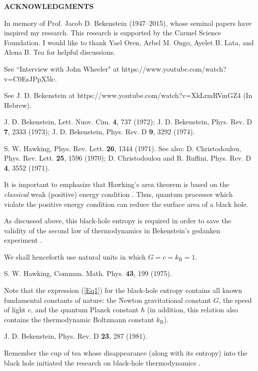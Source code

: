 \documentclass[12pt,preprintnumbers,amsmath,amssymbm,prd]{revtex4-1}
\begin{document}
\bigskip
\noindent
{\bf ACKNOWLEDGMENTS}
\bigskip

In memory of Prof. Jacob D. Bekenstein (1947--2015), whose seminal
papers have inspired my research.
\newline
This research is supported by the Carmel Science Foundation. I would
like to thank Yael Oren, Arbel M. Ongo, Ayelet B. Lata, and Alona B.
Tea for helpful discussions.

\begin{thebibliography}{99}

 See ``Interview with John Wheeler" at
https://www.youtube.com/watch?v=C0EsJPpX5lc.

 See J. D. Bekenstein at
https://www.youtube.com/watch?v=XkLrmRVmGZ4 (In Hebrew).

 J. D. Bekenstein, Lett. Nuov. Cim. {\bf 4}, 737 (1972); J. D.
Bekenstein, Phys. Rev. D {\bf 7}, 2333 (1973); J. D. Bekenstein,
Phys. Rev. D {\bf 9}, 3292 (1974).

 S. W. Hawking, Phys. Rev. Lett. {\bf 26}, 1344
(1971). See also: D. Christodoulou, Phys. Rev. Lett. {\bf 25}, 1596
(1970); D. Christodoulou and R. Ruffini, Phys. Rev. D {\bf 4}, 3552
(1971).

 It is important to emphasize that Hawking's area
theorem is based on the {\it classical} weak (positive) energy
condition \cite{Hawarea}. Thus, quantum processes which violate the
positive energy condition can reduce the surface area of a black
hole.

 As discussed above, this black-hole entropy is
required in order to save the validity of the second law of
thermodynamics in Bekenstein's gedanken experiment
\cite{WheLec,BekLec}.

 We shall henceforth use natural units in which
$G=c=k_{\text{B}}=1$.

 S. W. Hawking, Commun. Math. Phys. {\bf 43}, 199
(1975).

 Note that the expression (\ref{Eq1}) for the
black-hole entropy contains all known fundamental constants of
nature: the Newton gravitational constant $G$, the speed of light
$c$, and the quantum Planck constant $\hbar$ (in addition, this
relation also contains the thermodynamic Boltzmann constant
$k_{\text{B}}$).

 J. D. Bekenstein, Phys. Rev. D {\bf 23}, 287 (1981).

 Remember the cup of tea whose disappearance (along with its
entropy) into the black hole initiated the research on black-hole
thermodynamics \cite{WheLec,BekLec}.


\end{thebibliography}
\end{document}
